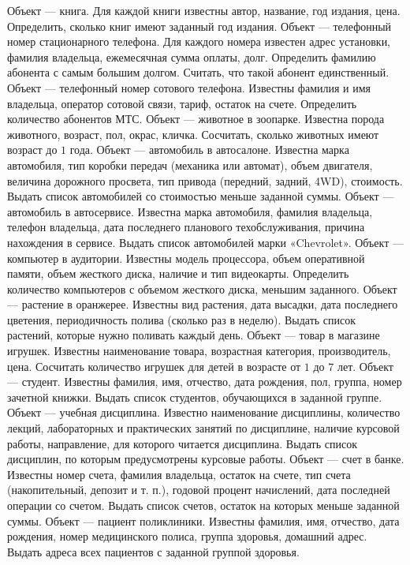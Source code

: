 Объект --- книга. Для каждой книги известны автор, название, год издания, цена. Определить, сколько книг имеют заданный год издания.
Объект --- телефонный номер стационарного телефона. Для каждого номера известен адрес установки, фамилия владельца, ежемесячная сумма оплаты, долг. Определить фамилию абонента с самым большим долгом. Считать, что такой абонент единственный.
Объект --- телефонный номер сотового телефона. Известны фамилия и имя владельца, оператор сотовой связи, тариф, остаток на счете. Определить количество абонентов МТС.
Объект --- животное в зоопарке. Известна порода животного, возраст, пол, окрас, кличка. Сосчитать, сколько животных имеют возраст до $1$ года.
Объект --- автомобиль в автосалоне. Известна марка автомобиля, тип коробки передач (механика или автомат), объем двигателя, величина дорожного просвета, тип привода (передний, задний, 4WD), стоимость. Выдать список автомобилей со стоимостью меньше заданной суммы.
Объект --- автомобиль в автосервисе. Известна марка автомобиля, фамилия владельца, телефон владельца, дата последнего планового техобслуживания, причина нахождения в сервисе. Выдать список автомобилей марки «Chevrolet».
Объект --- компьютер в аудитории. Известны модель процессора, объем оперативной памяти, объем жесткого диска, наличие и тип видеокарты. Определить количество компьютеров с объемом жесткого диска, меньшим заданного.
Объект --- растение в оранжерее. Известны вид растения, дата высадки, дата последнего цветения, периодичность полива (сколько раз в неделю). Выдать список растений, которые нужно поливать каждый день.
Объект --- товар в магазине игрушек. Известны наименование товара, возрастная категория, производитель, цена. Сосчитать количество игрушек для детей в возрасте от $1$ до $7$ лет.
Объект --- студент. Известны фамилия, имя, отчество, дата рождения, пол, группа, номер зачетной книжки. Выдать список студентов, обучающихся в заданной группе.
Объект --- учебная дисциплина. Известно наименование дисциплины, количество лекций, лабораторных и практических занятий по дисциплине, наличие курсовой работы, направление, для которого читается дисциплина. Выдать список дисциплин, по которым предусмотрены курсовые работы.
Объект --- счет в банке. Известны номер счета, фамилия владельца, остаток на счете, тип счета (накопительный, депозит и т. п.), годовой процент начислений, дата последней операции со счетом. Выдать список счетов, остаток на которых меньше заданной суммы.
Объект --- пациент поликлиники. Известны фамилия, имя, отчество, дата рождения, номер медицинского полиса, группа здоровья, домашний адрес. Выдать адреса всех пациентов с заданной группой здоровья.
